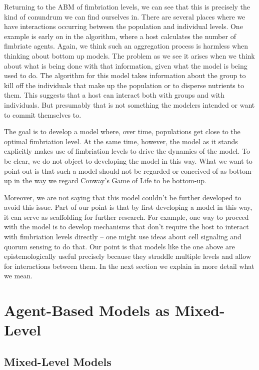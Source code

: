 \documentclass[11pt]{article}
\begin{document}
Returning to the ABM of fimbriation levels, we can see that this is precisely the kind of conundrum we can find ourselves in. There are several places where we have interactions occurring between the population and individual levels. One example is early on in the algorithm, where a host calculates the number of fimbriate agents. Again, we think such an aggregation process is harmless when thinking about bottom up models. The problem as we see it arises when we think about what is being  done with that information, given what the model is being used to do.  The algorithm for this model takes information about the group to kill off the individuals that make up the population or to disperse nutrients to them. This suggests that a host can interact both with groups and with individuals.  But presumably that is not something the modelers intended or want to commit themselves to.

The goal is to develop a model where, over time, populations get close to the optimal fimbriation level.  At the same time, however, the model as it stands explicitly makes use of fimbriation levels to drive the dynamics of the model.  To be clear, we do not object to developing the model in this way. What we want to point out is that such a model should not be regarded or conceived of as bottom-up in the way we regard Conway's Game of Life to be bottom-up. 

Moreover, we are not saying that this model couldn't be further developed to avoid this issue.  Part of our point is that by first developing a model in this way, it can serve as scaffolding for further research. For example, one way to proceed with the model is to develop mechanisms that don't require the host to interact with fimbriation levels directly -- one might use ideas about cell signaling and quorum sensing to do that. Our point is that models like the one above are epistemologically useful precisely because they straddle multiple levels and allow for interactions between them. In the next section we explain in more detail what we mean.


\section{Agent-Based Models as Mixed-Level}


\subsection{Mixed-Level Models}
\end{document}
